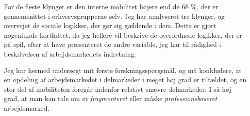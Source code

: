 For de fleste klynger er den interne mobilitet højere end de 68 \%, der er gennemsnittet i erhvervsgrupperne selv. Jeg har analyseret tre klynger, og overvejet de sociale logikker, der gør sig gældende i dem. Dette er gjort nogenlunde kortfattet, da jeg hellere vil beskrive de overordnede logikker, der er på spil, efter at have præsenteret de andre variable, jeg har til rådighed i beskrivelsen af arbejdsmarkedets indretning. 

Jeg har hermed undersøgt mit første forskningsspørgsmål, og må konkludere, at en opdeling af arbejdsmarkedet i delmarkeder i meget høj grad er tilfældet, og en stor del af mobiliteten foregår indenfor relativt snævre delmarkeder. I så høj grad, at man kan tale om et \emph{fragmenteret} eller måske \emph{professionsbaseret} arbejdsmarked.




% 
% 
%
%
%
%
%
%
%
%
%
%
%
%
%
%
%
%
